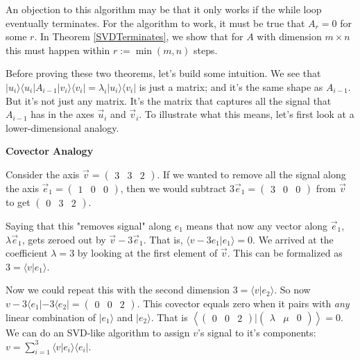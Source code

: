 \documentclass{amsbook}
\begin{document}
An objection to this algorithm may be that it only works if the while loop eventually terminates.  For the algorithm to work, it must be true that $A_r=0$ for some $r$.  In Theorem \ref{SVDTerminates}, we show that for $A$ with dimension $m\times n$ this must happen within $r := \min(m, n)$ steps.

Before proving these two theorems, let's build some intuition.  We see that $| u _i\rangle\langle u _i|A_{i-1}| v _i\rangle\langle v _i|=\lambda_i| u _i\rangle\langle v _i|$ is just a matrix; and it's the same shape as $A_{i-1}$.  But it's not just any matrix.  It's the matrix that captures all the signal that $A_{i-1}$ has in the axes $\vec u_i$ and $\vec v_i$.  To illustrate what this means, let's first look at a lower-dimensional analogy.

\begin{tcolorbox}[title=Example: Covector Analogy,colback=blue!5]
{\bfseries\Large Covector Analogy}
  
Consider the axis $\vec v=\left(\begin{array}{ccc} 3 & 3 & 2 \end{array}\right)$.  If we wanted to remove all the signal along the axis $\vec e_1 = \left(\begin{array}{ccc} 1 & 0 & 0 \end{array}\right)$, then we would subtract $3\vec e_1 = \left(\begin{array}{ccc} 3 & 0 & 0 \end{array}\right)$ from $\vec v$ to get $\left(\begin{array}{ccc} 0 & 3 & 2 \end{array}\right)$.

Saying that this "removes signal" along $e_1$ means that now any vector along $\vec e_1$, $\lambda\vec e_1$, gets zeroed out by $\vec v-3\vec e_1$.  That is, $\langle v-3e_1|e_1\rangle=0$.  We arrived at the coefficient $\lambda=3$ by looking at the first element of $\vec v$.  This can be formalized as $3=\langle v|e_1\rangle$.

Now we could repeat this with the second dimension $3=\langle v|e_2\rangle$.  So now $v-3\langle e_1|-3\langle e_2| = \left(\begin{array}{ccc} 0 & 0 & 2 \end{array}\right)$.  This covector equals zero when it pairs with {\em any} linear combination of $|e_1\rangle$ and $|e_2\rangle$.  That is $\left\langle\left(\begin{array}{ccc} 0 & 0 & 2 \end{array}\right)|\left(\begin{array}{ccc} \lambda & \mu & 0 \end{array}\right)\right\rangle = 0$.  We can do an SVD-like algorithm to assign $v$'s signal to it's components: $v = \sum_{i=1}^3\langle v|e_i\rangle\langle e_i|$.


\end{tcolorbox}
\end{document}

